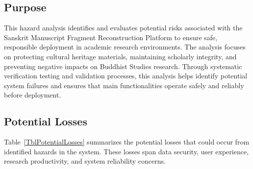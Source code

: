 \documentclass{article}
\begin{document}
\subsection{Purpose}

This hazard analysis identifies and evaluates potential risks associated with the Sanskrit Manuscript Fragment Reconstruction Platform to ensure safe, responsible deployment in academic research environments. The analysis focuses on protecting cultural heritage materials, maintaining scholarly integrity, and preventing negative impacts on Buddhist Studies research. Through systematic verification testing and validation processes, this analysis helps identify potential system failures and ensures that main functionalities operate safely and reliably before deployment.

\subsection{Potential Losses}

Table~\ref{TblPotentialLosses} summarizes the potential losses that could occur from identified hazards in the system. These losses span data security, user experience, research productivity, and system reliability concerns.
\end{document}
